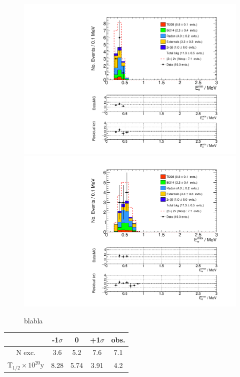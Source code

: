 \documentclass[main.tex]{subfiles}
\begin{document}
\begin{figure} [h!]
\begin{center}
\includegraphics[scale=0.5]{pictures/FinalResults/bb2nu2/250/Eemin_bb2nu2.pdf}
\includegraphics[scale=0.5]{pictures/FinalResults/bb2nu2/250/Eemax_bb2nu2.pdf}
\end{center}
\caption{blabla}
\label{plot:EeminAndEemax250bb2nu2}
\end{figure}


\begin{table}
\centering
\begin{tabular}{c|c|c|c||c}
                                                & -1$\sigma$ & 0        & +1$\sigma$ & obs.     \\[0.2cm]
\hline
N exc.                                          & 3.6        & 5.2      & 7.6        & 7.1      \\[0.2cm]
T$_{\text{1/2}} \times \text{10}^{\text{20}}$y  & 8.28       & 5.74     & 3.91       & 4.2      \\[0.2cm]
\hline
\end{tabular}
\end{table}
\end{document}
